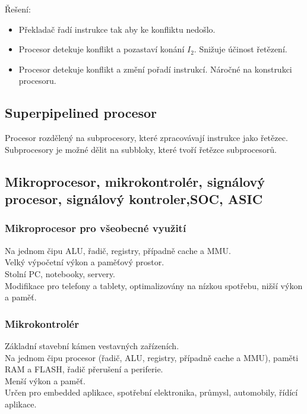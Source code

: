 Řešení:
\begin{itemize}
    \item Překladač řadí instrukce tak aby ke konfliktu nedošlo.
    \item Procesor detekuje konflikt a pozastaví konání $I_2$. Snižuje účinost řetězení.
    \item Procesor detekuje konflikt a změní pořadí instrukcí. Náročné na konstrukci procesoru.
\end{itemize}

\subsection{Superpipelined procesor}
Procesor rozdělený na subprocesory, které zpracovávají instrukce jako řetězec. \\
Subprocesory je možné dělit na subbloky, které tvoří řetězce subprocesorů. \\

\subsection{Mikroprocesor, mikrokontrolér, signálový procesor, signálový kontroler,SOC, ASIC}
\subsubsection{Mikroprocesor pro všeobecné využití}
Na jednom čipu ALU, řadič, registry, případně cache a MMU.\\
Velký výpočetní výkon a paměťový prostor.\\
Stolní PC, notebooky, servery.\\
Modifikace pro telefony a tablety, optimalizovány na nízkou spotřebu, nižší výkon a paměť. \\

\subsubsection*{Mikrokontrolér}
Základní stavební kámen vestavných zařízeních. \\
Na jednom čipu procesor (řadič, ALU, registry, případně cache a MMU), paměti RAM a FLASH, řadič přerušení a periferie.\\
Menší výkon a paměť.\\
Určen pro embedded aplikace, spotřební elektronika, průmysl, automobily, řídící aplikace. \\

